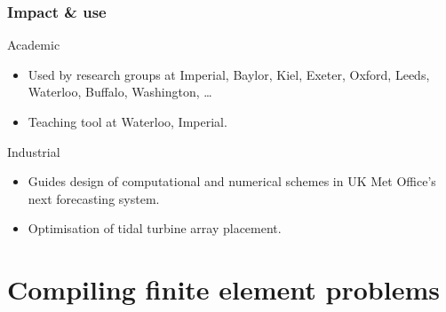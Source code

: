 \documentclass[presentation]{beamer}
\begin{document}
\begin{frame}
  \frametitle{Impact \& use}
  \begin{block}{Academic}
    \begin{itemize}
    \item Used by research groups at Imperial, Baylor, Kiel, Exeter,
      Oxford, Leeds, Waterloo, Buffalo, Washington, \ldots

    \item Teaching tool at Waterloo, Imperial.
    \end{itemize}
  \end{block}
  \begin{block}{Industrial}
    \begin{itemize}
    \item Guides design of computational and numerical schemes in UK
      Met Office's next forecasting system.

    \item Optimisation of tidal turbine array placement.
    \end{itemize}
  \end{block}
\end{frame}

\section{Compiling finite element problems}
\end{document}
